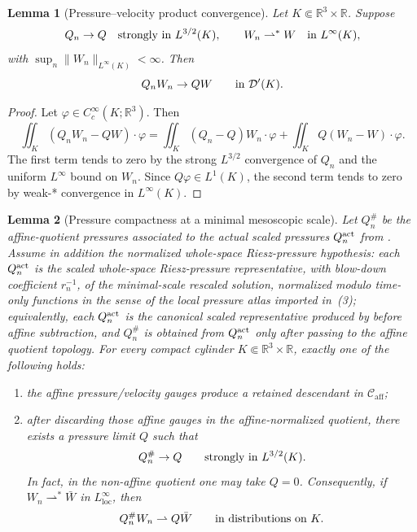 \documentclass[11pt]{amsart}
\numberwithin{equation}{section}
\theoremstyle{plain}
\newtheorem{lemma}[lemma]{Lemma}
\theoremstyle{definition}
\theoremstyle{remark}
\newcommand{\loc}{\mathrm{loc}}
\newcommand{\Caff}{\mathcal C_{\mathrm{aff}}}
\begin{document}
\begin{lemma}[Pressure--velocity product convergence]
\label{lem:pressure-velocity-product-convergence}
Let \(K\Subset\mathbb R^3\times\mathbb R\).  Suppose
\[
   Q_n\to Q\quad\hbox{strongly in }L^{3/2}(K),
   \qquad
   W_n\rightharpoonup^\ast W\quad\hbox{in }L^\infty(K),
\]
with \(\sup_n\|W_n\|_{L^\infty(K)}<\infty\).  Then
\[
   Q_nW_n\to QW
   \qquad\hbox{in }\mathcal D'(K).
\]
\end{lemma}

\begin{proof}
Let \(\varphi\in C_c^\infty(K;\mathbb R^3)\).  Then
\[
   \iint_K (Q_nW_n-QW)\cdot\varphi
   =
   \iint_K (Q_n-Q)W_n\cdot\varphi
   +\iint_K Q(W_n-W)\cdot\varphi .
\]
The first term tends to zero by the strong \(L^{3/2}\) convergence of \(Q_n\)
and the uniform \(L^\infty\) bound on \(W_n\).  Since \(Q\varphi\in L^1(K)\),
the second term tends to zero by weak-* convergence in \(L^\infty(K)\).
\end{proof}

\begin{lemma}[Pressure compactness at a minimal mesoscopic scale]
\label{lem:first-bad-pressure-compactness}
Let \(Q_n^\#\) be the affine-quotient pressures associated to the actual scaled
pressures \(Q_n^{\rm act}\) from .  Assume in
addition the \emph{normalized whole-space Riesz-pressure hypothesis}: each
\(Q_n^{\rm act}\) is the scaled whole-space Riesz-pressure representative, with
blow-down coefficient \(r_n^{-1}\), of the minimal-scale rescaled solution,
normalized modulo time-only functions in the sense of the local pressure atlas
imported in \,(3); equivalently, each
\(Q_n^{\rm act}\) is the canonical scaled representative produced by
 before affine subtraction, and
\(Q_n^\#\) is obtained from \(Q_n^{\rm act}\) only after passing to the affine
quotient topology.
For every compact cylinder \(K\Subset\mathbb R^3\times\mathbb R\), exactly
one of the following holds:
\begin{enumerate}[label=\textup{(\roman*)}]
   \item the affine pressure/velocity gauges produce a retained descendant in
   \(\Caff\);
   \item after discarding those affine gauges in the affine-normalized quotient,
   there exists a pressure limit \(Q\) such that
\[
   Q_n^\#\to Q
   \qquad\hbox{strongly in }L^{3/2}(K).
\]
   In fact, in the non-affine quotient one may take \(Q=0\).  Consequently, if
   \(W_n\rightharpoonup^\ast \bar W\) in \(L^\infty_{\loc}\), then
\[
   Q_n^\#W_n\rightharpoonup Q\bar W
   \qquad\hbox{in distributions on }K .
\]
\end{enumerate}
\end{lemma}
\end{document}
